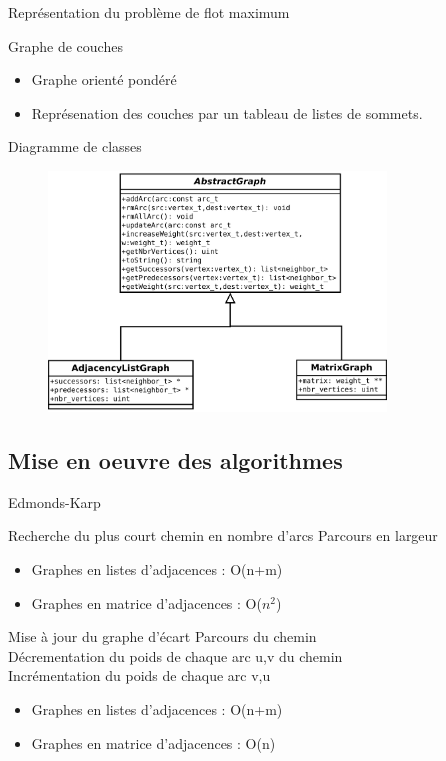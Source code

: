 \begin{frame}{Représentation du problème de flot maximum}
	\begin{block}{Graphe de couches}
  	\begin{itemize}
    	\item Graphe orienté pondéré
  	  \item Représenation des couches par un tableau de listes de sommets.
  	\end{itemize}
	\end{block}
\end{frame}

\begin{frame}{Diagramme de classes}
	\begin{figure}
	\includegraphics[width=0.8\textwidth]{img/diag_class.pdf}
	\end{figure}
\end{frame}

\subsection{Mise en oeuvre des algorithmes}

\begin{frame}{Edmonds-Karp}
	\begin{block}{Recherche du plus court chemin en nombre d'arcs}
  	Parcours en largeur
  	\begin{itemize}
    	\item Graphes en listes d'adjacences : O(n+m)
  	  \item Graphes en matrice d'adjacences : O($n^2$)
  	\end{itemize}
  \end{block}
  \begin{block}{Mise à jour du graphe d'écart}
  	Parcours du chemin \\
  	Décrementation du poids de chaque arc u,v du chemin \\
  	Incrémentation du poids de chaque arc v,u \\
  	\begin{itemize}
    	\item Graphes en listes d'adjacences : O(n+m)
  	  \item Graphes en matrice d'adjacences : O(n)
  	\end{itemize}
  \end{block}
\end{frame}

